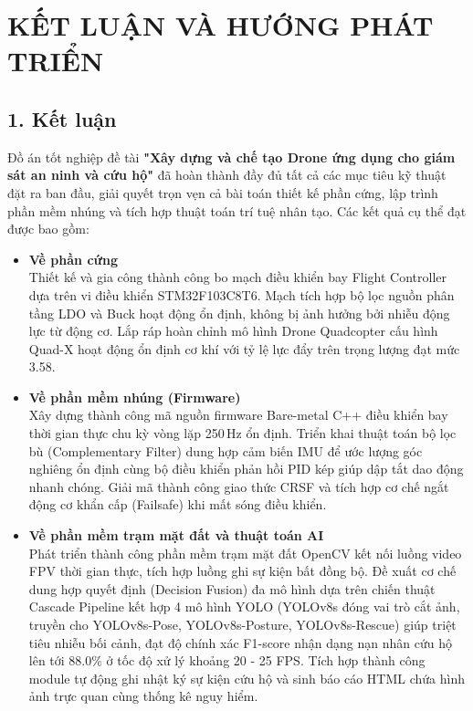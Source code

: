 \section*{KẾT LUẬN VÀ HƯỚNG PHÁT TRIỂN}

\subsection*{1. Kết luận}

Đồ án tốt nghiệp đề tài \textbf{"Xây dựng và chế tạo Drone ứng dụng cho giám sát an ninh và cứu hộ"} đã hoàn thành đầy đủ tất cả các mục tiêu kỹ thuật đặt ra ban đầu, giải quyết trọn vẹn cả bài toán thiết kế phần cứng, lập trình phần mềm nhúng và tích hợp thuật toán trí tuệ nhân tạo. Các kết quả cụ thể đạt được bao gồm:

\begin{itemize}
    \item \textbf{Về phần cứng}\\
    Thiết kế và gia công thành công bo mạch điều khiển bay Flight Controller dựa trên vi điều khiển STM32F103C8T6. Mạch tích hợp bộ lọc nguồn phân tầng LDO và Buck hoạt động ổn định, không bị ảnh hưởng bởi nhiễu động lực từ động cơ. Lắp ráp hoàn chỉnh mô hình Drone Quadcopter cấu hình Quad-X hoạt động ổn định cơ khí với tỷ lệ lực đẩy trên trọng lượng đạt mức 3.58.

    \item \textbf{Về phần mềm nhúng (Firmware)}\\
    Xây dựng thành công mã nguồn firmware Bare-metal C++ điều khiển bay thời gian thực chu kỳ vòng lặp 250\,Hz ổn định. Triển khai thuật toán bộ lọc bù (Complementary Filter) dung hợp cảm biến IMU để ước lượng góc nghiêng ổn định cùng bộ điều khiển phản hồi PID kép giúp dập tắt dao động nhanh chóng. Giải mã thành công giao thức CRSF và tích hợp cơ chế ngắt động cơ khẩn cấp (Failsafe) khi mất sóng điều khiển.

    \item \textbf{Về phần mềm trạm mặt đất và thuật toán AI}\\
    Phát triển thành công phần mềm trạm mặt đất OpenCV kết nối luồng video FPV thời gian thực, tích hợp luồng ghi sự kiện bất đồng bộ. Đề xuất cơ chế dung hợp quyết định (Decision Fusion) đa mô hình dựa trên chiến thuật Cascade Pipeline kết hợp 4 mô hình YOLO (YOLOv8s đóng vai trò cắt ảnh, truyền cho YOLOv8s-Pose, YOLOv8s-Posture, YOLOv8s-Rescue) giúp triệt tiêu nhiễu bối cảnh, đạt độ chính xác F1-score nhận dạng nạn nhân cứu hộ lên tới 88.0\% ở tốc độ xử lý khoảng 20 - 25 FPS. Tích hợp thành công module tự động ghi nhật ký sự kiện cứu hộ và sinh báo cáo HTML chứa hình ảnh trực quan cùng thống kê nguy hiểm.
\end{itemize}


